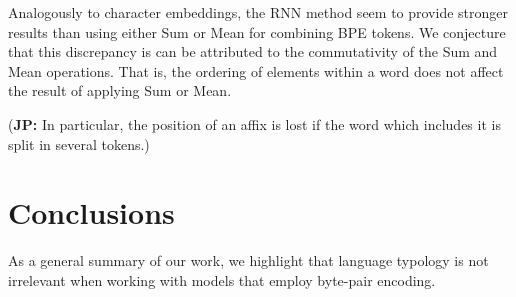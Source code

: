 \documentclass[11pt]{article}
\newcommand\jp[1]{(\textbf{JP:} #1)}
\begin{document}
        Analogously to character embeddings, the RNN method seem to
        provide stronger results than using either Sum or Mean for
        combining BPE tokens. We conjecture that this discrepancy is
        can be attributed to the commutativity of the Sum and Mean
        operations. That is, the ordering of elements within a word
        does not affect the result of applying Sum or Mean.
          
        \jp{In particular, the position of an affix is lost if the
          word which includes it is split in several tokens.}
    
    \section{Conclusions}
    	As a general summary of our work, we highlight that language typology is not irrelevant when working with models that employ byte-pair encoding.
	
	
	
	
	
	
\end{document}

